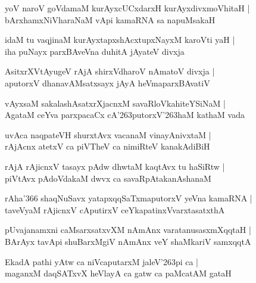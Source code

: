 \begin{shloka}
yoV naroV goVdamaM kurAyxcUCxdarxH kurAyxdivxmoVhitaH |\\
bArxhamxNiVharaNaM vApi kamaRNA sa napuMsakaH 
\end{shloka}

\begin{shloka}
idaM tu vaqjinaM kurAyxtapxshAcxtupxNayxM karoVti yaH |\\
iha puNayx parxBAveVna duhitA jAyateV divxja
\end{shloka}

\begin{shloka}
AsitxrXVtAyugeV rAjA shirxVdharoV nAmatoV divxja |\\
aputorxV dhanavAMsatxsayx jAyA heVmaparxBAvatiV
\end{shloka}

\begin{shloka}
vAyxsaM sakalashAsatxrXjacnxM savaRloVkahiteYSiNaM |\\
AgataM ceYva parxpacaCx cA\char'263putorxV\char'263haM kathaM vada
\end{shloka}

\begin{shloka}
uvAca naqpateVH shurxtAvx vacanaM vinayAnivxtaM |\\
rAjAcnx atetxV ca piVTheV ca nimiRteV kanakAdiBiH
\end{shloka}

\begin{shloka}
rAjA rAjicnxV tasayx pAdw dhwtaM kaqtAvx tu haSiRtw |\\
piVtAvx pAdoVdakaM dwvx ca savaRpAtakanAshanaM
\end{shloka}

\begin{shloka}
rAha\char'366 shaqNuSavx yatapxqqSaTxmaputorxV yeVna kamaRNA |\\
taveVyaM rAjicnxV cAputirxV ceYkapatinxVvarxtasatxthA 
\end{shloka}

\begin{shloka}
pUvajanamxni caMsarxsatxvXM nAmAnx varatanusasxmXqqtaH |\\
BArAyx tavApi shuBarxMgiV nAmAnx veY shaMkariV samxqqtA
\end{shloka}

\begin{shloka}
EkadA pathi yAtw ca niVcaputarxM jaleV\char'263pi ca |\\
maganxM daqSATxvX heVlayA ca gatw ca paMcatAM gataH 
\end{shloka}

